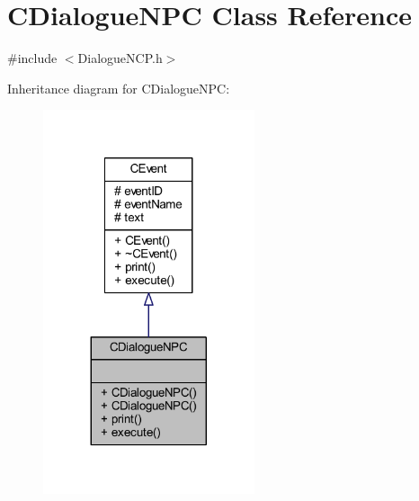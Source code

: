 \hypertarget{class_c_dialogue_n_p_c}{}\section{C\+Dialogue\+N\+PC Class Reference}
\label{class_c_dialogue_n_p_c}


{\ttfamily \#include $<$Dialogue\+N\+C\+P.\+h$>$}



Inheritance diagram for C\+Dialogue\+N\+PC\+:\nopagebreak
\begin{figure}[H]
\begin{center}
\leavevmode
\includegraphics[width=176pt]{class_c_dialogue_n_p_c__inherit__graph}
\end{center}
\end{figure}


